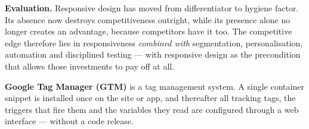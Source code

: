 \begin{qlist}
\textbf{Evaluation.} Responsive design has moved from differentiator to hygiene
factor. Its absence now destroys competitiveness outright, while its presence
alone no longer creates an advantage, because competitors have it too. The
competitive edge therefore lies in responsiveness \emph{combined with}
segmentation, personalisation, automation and disciplined testing --- with
responsive design as the precondition that allows those investments to pay off
at all.

\textbf{Google Tag Manager (GTM)} is a tag management system. A single
container snippet is installed once on the site or app, and thereafter all
tracking tags, the triggers that fire them and the variables they read are
configured through a web interface --- without a code release.


\end{qlist}
